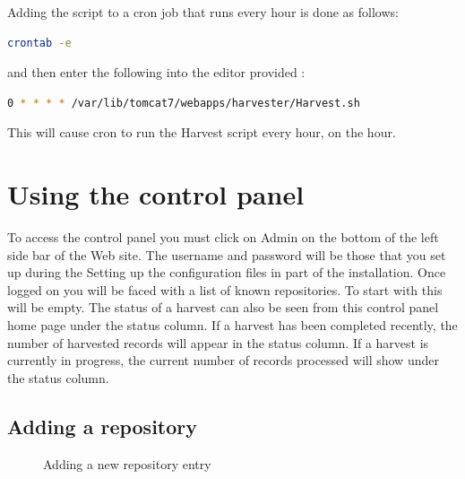 \documentclass[a4paper,11pt]{article}
\begin{document}
Adding the script to a cron job that runs every hour is done as follows: 

\begin{lstlisting}[language=bash]
crontab -e
\end{lstlisting}

and then enter the following into the editor provided : 

\begin{lstlisting}[language=bash]
0 * * * * /var/lib/tomcat7/webapps/harvester/Harvest.sh
\end{lstlisting}

This will cause cron to run the Harvest script every hour, on the hour.

\section{Using the control panel}
\label{sec:using_the_control_panel}

To access the control panel you must click on Admin on the bottom of the left side bar of the Web site. The username and password will be those that you set up during the Setting up the configuration files in  part of the installation. Once logged on you will be faced with a list of known repositories. To start with this will be empty. The status of a harvest can also be seen from this control panel home page under the status column. If a harvest has been completed recently, the number of harvested records will appear in the status column. If a harvest is currently in progress, the current number of records processed will show under the status column.

\subsection{Adding a repository}
\label{sec:using_the_control_panel:adding_a_repository}

\begin{figure}[h]
 \centering
 \caption{Adding a new repository entry}
 \label{adding_repository_information}
\end{figure}
\end{document}
